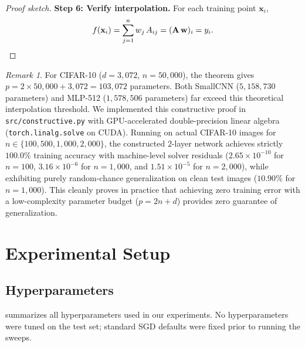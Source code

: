 \documentclass[12pt,a4paper]{article}
\newif\ifshowguides
\newcommand{\guide}[1]{%
  \ifshowguides
    \begin{tcolorbox}[colframe=blue!60,colback=blue!5,
                      title={\small\textbf{Instructor Guide}},
                      fonttitle=\small\bfseries]
      {\small\textit{Guide: }#1}
    \end{tcolorbox}
  \fi
}
\theoremstyle{definition}
\theoremstyle{remark}
\newtheorem{remark}[theorem]{Remark}
\begin{document}
\begin{proof}[Proof sketch]
\textbf{Step 6: Verify interpolation.}
For each training point $\mathbf{x}_i$,
\begin{equation}
  f(\mathbf{x}_i)
    = \sum_{j=1}^{n} w_j\, A_{ij}
    = (\mathbf{A}\,\mathbf{w})_i = y_i. \qedhere
  \label{eq:verify}
\end{equation}
\end{proof}

\begin{remark}
  For CIFAR-10 ($d = 3{,}072$, $n = 50{,}000$), the theorem gives
  $p = 2 \times 50{,}000 + 3{,}072 = 103{,}072$ parameters. Both SmallCNN
  ($5{,}158{,}730$ parameters) and MLP-512 ($1{,}578{,}506$ parameters) far
  exceed this theoretical interpolation threshold.
  We implemented this constructive proof in \texttt{src/constructive.py} with GPU-accelerated double-precision linear algebra (\texttt{torch.linalg.solve} on CUDA).
  Running on actual CIFAR-10 images for $n \in \{100, 500, 1{,}000, 2{,}000\}$, the constructed 2-layer network achieves strictly $100.0\%$ training accuracy with machine-level solver residuals ($2.65\times 10^{-10}$ for $n=100$, $3.16\times 10^{-6}$ for $n=1{,}000$, and $1.51\times 10^{-5}$ for $n=2{,}000$), while exhibiting purely random-chance generalization on clean test images ($10.90\%$ for $n=1{,}000$).
  This cleanly proves in practice that achieving zero training error with a low-complexity parameter budget ($p = 2n + d$) provides zero guarantee of generalization.
\end{remark}

\section{Experimental Setup}
\label{sec:setup}

\guide{%
  Describe \emph{exactly} what you ran so that another student could
  reproduce your results without reading the code. Provide a hyperparameter
  table, state deviations from the original paper explicitly, and mention
  the hardware you used.
}

\subsection{Hyperparameters}

 summarizes all hyperparameters used in our experiments. No hyperparameters were tuned on the test set; standard SGD defaults were fixed prior to running the sweeps.
\end{document}
